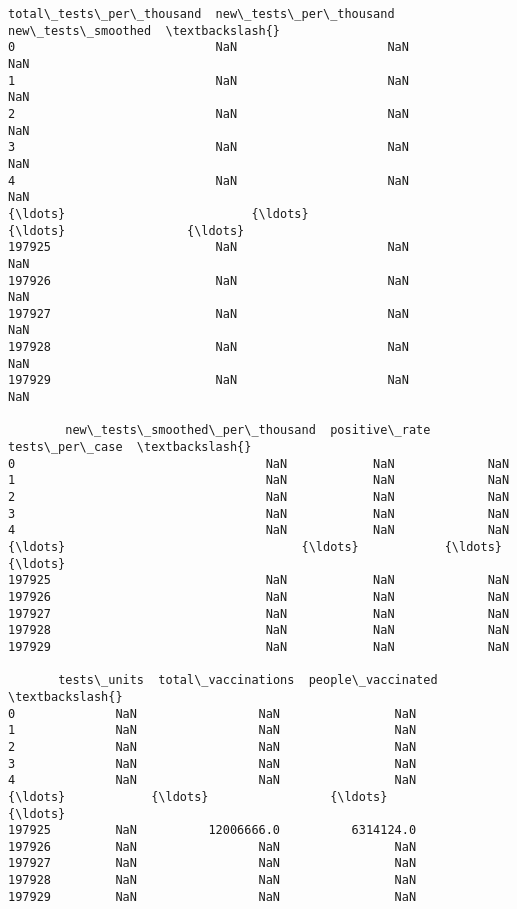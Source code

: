 \documentclass[11pt]{article}
\begin{document}
\begin{tcolorbox}[breakable, size=fbox, boxrule=.5pt, pad at break*=1mm, opacityfill=0]
\begin{Verbatim}[commandchars=\\\{\}]
        total\_tests\_per\_thousand  new\_tests\_per\_thousand  new\_tests\_smoothed  \textbackslash{}
0                            NaN                     NaN                 NaN
1                            NaN                     NaN                 NaN
2                            NaN                     NaN                 NaN
3                            NaN                     NaN                 NaN
4                            NaN                     NaN                 NaN
{\ldots}                          {\ldots}                     {\ldots}                 {\ldots}
197925                       NaN                     NaN                 NaN
197926                       NaN                     NaN                 NaN
197927                       NaN                     NaN                 NaN
197928                       NaN                     NaN                 NaN
197929                       NaN                     NaN                 NaN

        new\_tests\_smoothed\_per\_thousand  positive\_rate  tests\_per\_case  \textbackslash{}
0                                   NaN            NaN             NaN
1                                   NaN            NaN             NaN
2                                   NaN            NaN             NaN
3                                   NaN            NaN             NaN
4                                   NaN            NaN             NaN
{\ldots}                                 {\ldots}            {\ldots}             {\ldots}
197925                              NaN            NaN             NaN
197926                              NaN            NaN             NaN
197927                              NaN            NaN             NaN
197928                              NaN            NaN             NaN
197929                              NaN            NaN             NaN

       tests\_units  total\_vaccinations  people\_vaccinated  \textbackslash{}
0              NaN                 NaN                NaN
1              NaN                 NaN                NaN
2              NaN                 NaN                NaN
3              NaN                 NaN                NaN
4              NaN                 NaN                NaN
{\ldots}            {\ldots}                 {\ldots}                {\ldots}
197925         NaN          12006666.0          6314124.0
197926         NaN                 NaN                NaN
197927         NaN                 NaN                NaN
197928         NaN                 NaN                NaN
197929         NaN                 NaN                NaN


\end{Verbatim}
\end{tcolorbox}
\end{document}
